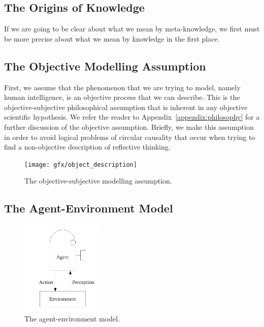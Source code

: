 \subsection{The Origins of Knowledge}

If we are going to be clear about what we mean by meta-knowledge, we
first must be more precise about what we mean by knowledge in the
first place.

\subsection{The Objective Modelling Assumption}

First, we assume that the phenomenon that we are trying to model,
namely human intelligence, is an objective process that we can
describe.  This is the objective-subjective philosophical assumption
that is inherent in any objective scientific hypothesis.  We refer the
reader to Appendix~\ref{appendix:philosophy} for a further discussion
of the objective assumption.  Briefly, we make this assumption in
order to avoid logical problems of circular causality that occur when
trying to find a non-objective description of reflective thinking.

\begin{figure}[bth]
  \center
  \texttt{[image: gfx/object\_description]}
  \caption[The objective-subjective modelling assumption]{The objective-subjective modelling assumption.}
  \label{fig:object_description}
\end{figure}

\subsection{The Agent-Environment Model}

\begin{figure}[bth]
  \center
  \includegraphics[width=4cm]{gfx/agent_environment}
  \caption[The agent-environment model]{The agent-environment model.}
  \label{fig:agent_environment}
\end{figure}

